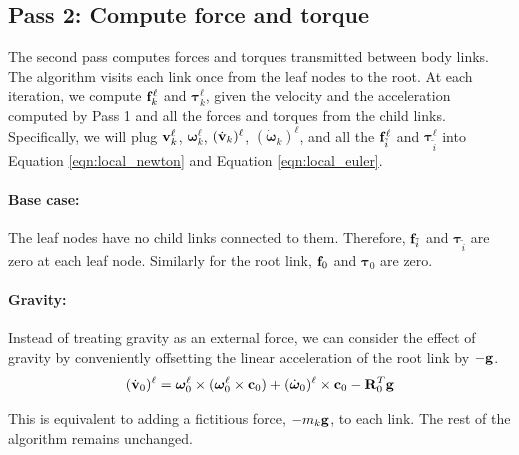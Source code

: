 \subsection{Pass 2: Compute force and torque}
The second pass computes forces and torques transmitted
between body links. The algorithm visits each link once from the leaf
nodes to the root. At each iteration, we compute $\mathbf{f}_k^\ell$
and $\bm{\tau}_k^\ell$, given the velocity and the acceleration computed
by Pass 1 and all the forces and torques from the child
links. Specifically, we will plug $\mathbf{v}_k^\ell$,
$\bm{\omega}_k^\ell$, $(\dot{\mathbf{v}}_k)^\ell$,
$(\dot{\bm{\omega}}_k)^\ell$, and all the $\mathbf{f}_{\tilde{i}}^\ell$ and
$\bm{\tau}_{\tilde{i}}^\ell$ into Equation \ref{eqn:local_newton} and
Equation \ref{eqn:local_euler}.

\paragraph{Base case:} The leaf nodes have no child links connected to
them. Therefore, $\mathbf{f}_{\tilde{i}}$ and $\bm{\tau}_{\tilde{i}}$ are
zero at each leaf node. Similarly for the root link, $\mathbf{f}_0$ and
$\bm{\tau}_0$ are zero.

\paragraph{Gravity:}
Instead of treating gravity as an external force, we can consider the
effect of gravity by conveniently offsetting the linear acceleration
of the root link by $-\mathbf{g}$. 
\begin{equation}
(\dot{\mathbf{v}}_0)^\ell = \bm{\omega}_0^\ell \times (\bm{\omega}_0^\ell
\times \mathbf{c}_0) + (\dot{\bm{\omega}}_0)^\ell \times \mathbf{c}_0 -
\mathbf{R}_0^T \mathbf{g}
\end{equation}

This is equivalent to adding a fictitious force, $-m_k \mathbf{g}$, to
each link.  The rest of the algorithm remains unchanged.
